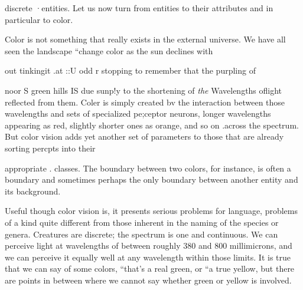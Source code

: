 discrete ·entities. Let us now turn from entities to their attributes and in particular to color. 

Color is not something that really exists in the external universe. We have all seen the landscape ``change color as the sun declines with

out tinkingit .at ::U odd r stopping to remember that the purpling of

noor S green hills IS due sunp!y to the shortening of \textit{the} Wavelengths oflight reflected from them. Coler is simply created bv the interaction between those wavelengths and sets of specialized pe;ceptor neurons, longer wavelengths appearing as red, slightly shorter ones as orange, and so on .across the spectrum. But color vision adds yet another set
 of parameters to those that are already sorting percpts into their 

appropriate . classes. The boundary between two colors, for instance, is often a boundary and sometimes perhaps the only boundary between another entity and its background.

Useful though color vision is, it presents serious problems for language, problems of a kind quite different from those inherent in the naming of the species or genera. Creatures are discrete; the spec\-trum is one and continuous. We can perceive light at wavelengths of between roughly 380 and 800 millimicrons, and we can perceive it equally well at any wavelength within those limits. It is true that we can say of some colors, ``that's a real green, or ``a true yellow, but there are points in between where we cannot say whether green or yellow is involved.

